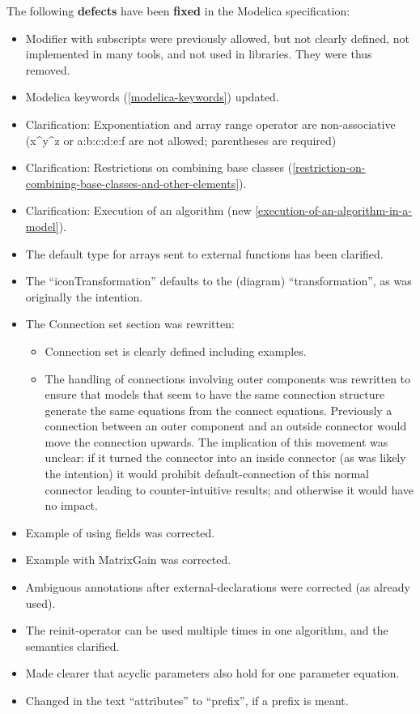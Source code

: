 \documentclass[10pt,a4paper]{report}
\begin{document}
The following \textbf{defects} have been \textbf{fixed} in the Modelica
specification:

\begin{itemize}
\item
  Modifier with subscripts were previously allowed, but not clearly
  defined, not implemented in many tools, and not used in libraries.
  They were thus removed.
\item
  Modelica keywords (\ref{modelica-keywords}) updated.
\item
  Clarification: Exponentiation and array range operator are
  non-associative\\
  (x\^{}y\^{}z or a:b:c:d:e:f are not allowed; parentheses are required)
\item
  Clarification: Restrictions on combining base classes (\ref{restriction-on-combining-base-classes-and-other-elements}).
\item
  Clarification: Execution of an algorithm (new \ref{execution-of-an-algorithm-in-a-model}).
\item
  The default type for arrays sent to external functions has been
  clarified.
\item
  The ``iconTransformation'' defaults to the (diagram)
  ``transformation'', as was originally the intention.
\item
  The Connection set section was rewritten:

  \begin{itemize}
  \item
    Connection set is clearly defined including examples.
  \item
    The handling of connections involving outer components was rewritten
    to ensure that models that seem to have the same connection
    structure generate the same equations from the connect equations.
    Previously a connection between an outer component and an outside
    connector would move the connection upwards. The implication of this
    movement was unclear: if it turned the connector into an inside
    connector (as was likely the intention) it would prohibit
    default-connection of this normal connector leading to
    counter-intuitive results; and otherwise it would have no impact.
  \end{itemize}
\item
  Example of using fields was corrected.
\item
  Example with MatrixGain was corrected.
\item
  Ambiguous annotations after external-declarations were corrected (as
  already used).
\item
  The reinit-operator can be used multiple times in one algorithm, and
  the semantics clarified.
\item
  Made clearer that acyclic parameters also hold for one parameter
  equation.
\item
  Changed in the text ``attributes'' to ``prefix'', if a prefix is
  meant.
\end{itemize}
\end{document}
